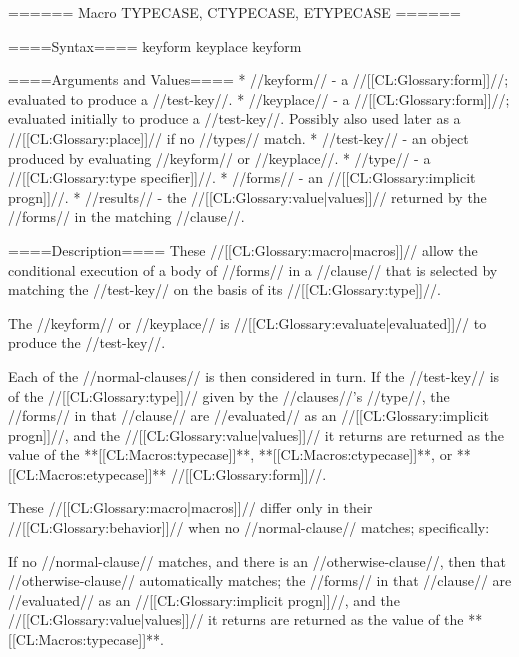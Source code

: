 ====== Macro TYPECASE, CTYPECASE, ETYPECASE ======

====Syntax====
 {keyform  } {}  {keyplace } {}  {keyform } {}

   

====Arguments and Values====
  * //keyform// - a //[[CL:Glossary:form]]//; evaluated to produce a //test-key//.
  * //keyplace// - a //[[CL:Glossary:form]]//; evaluated initially to produce a //test-key//. Possibly also used later as a //[[CL:Glossary:place]]// if no //types// match.
  * //test-key// - an object produced by evaluating //keyform// or //keyplace//.
  * //type// - a //[[CL:Glossary:type specifier]]//.
  * //forms// - an //[[CL:Glossary:implicit progn]]//.
  * //results// - the //[[CL:Glossary:value|values]]// returned by the //forms// in the matching //clause//.

====Description====
These //[[CL:Glossary:macro|macros]]// allow the conditional execution of a body of //forms// in a //clause// that is selected by matching the //test-key// on the basis of its //[[CL:Glossary:type]]//.

The //keyform// or //keyplace// is //[[CL:Glossary:evaluate|evaluated]]// to produce the //test-key//.

Each of the //normal-clauses// is then considered in turn. If the //test-key// is of the //[[CL:Glossary:type]]// given by the //clauses//'s //type//, the //forms// in that //clause// are //evaluated// as an //[[CL:Glossary:implicit progn]]//, and the //[[CL:Glossary:value|values]]// it returns are returned as the value of the **[[CL:Macros:typecase]]**, **[[CL:Macros:ctypecase]]**, or **[[CL:Macros:etypecase]]** //[[CL:Glossary:form]]//.

These //[[CL:Glossary:macro|macros]]// differ only in their //[[CL:Glossary:behavior]]// when no //normal-clause// matches; specifically:

\beginlist


If no //normal-clause// matches, and there is an //otherwise-clause//, then that //otherwise-clause// automatically matches; the //forms// in that //clause// are //evaluated// as an //[[CL:Glossary:implicit progn]]//, and the //[[CL:Glossary:value|values]]// it returns are returned as the value of the **[[CL:Macros:typecase]]**.

